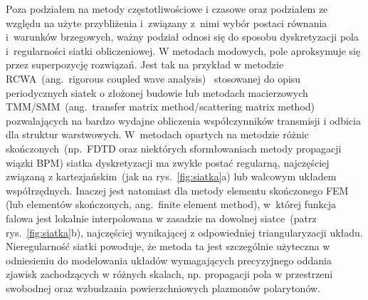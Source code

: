 Poza podziałem na metody częstotliwościowe i czasowe oraz podziałem ze względu na użyte przybliżenia i~związany z~nimi wybór postaci równania i~warunków brzegowych, ważny podział odnosi się do sposobu dyskretyzacji pola i~regularności siatki obliczeniowej. W metodach modowych, pole aproksymuje się przez superpozycję rozwiązań. Jest tak na przykład w metodzie RCWA~(ang.~rigorous coupled wave analysis)~\cite{hench2008rcwa} stosowanej do opisu periodycznych siatek o złożonej budowie lub metodach macierzowych TMM/SMM~(ang.~transfer matrix method/scattering matrix method)~\cite{teich1991fundamentalsTMM,yeh2006} pozwalających na bardzo wydajne obliczenia współczynników transmisji i odbicia dla struktur warstwowych. W~metodach opartych na metodzie różnic skończonych~(np.~FDTD oraz niektórych sformłowaniach metody propagacji wiązki BPM) siatka dyskretyzacji ma zwykle postać regularną, najczęściej związaną z kartezjańskim~(jak na rys.~\ref{fig:siatka}a) lub walcowym układem współrzędnych. Inaczej jest natomiast dla metody elementu skończonego FEM (lub elementów skończonych, ang.~finite element method), w~której funkcja falowa jest lokalnie interpolowana w zasadzie na dowolnej siatce~(patrz rys.~\ref{fig:siatka}b), najczęściej wynikającej z odpowiedniej triangularyzacji układu. Nieregularność siatki powoduje, że metoda ta jest szczególnie użyteczna w odniesieniu do modelowania układów wymagających precyzyjnego oddania zjawisk zachodzących w różnych skalach, np. propagacji pola w przestrzeni swobodnej oraz wzbudzania powierzchniowych plazmonów polarytonów.


